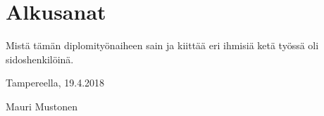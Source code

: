 \chapter*{Alkusanat}
\label{ch:alkusanat}

\begin{it}
	Mistä tämän diplomityönaiheen sain ja kiittää eri ihmisiä ketä työssä oli sidoshenkilöinä.
\end{it}

\vspace{2\baselineskip}

Tampereella, 19.4.2018

\vspace{2\baselineskip}

Mauri Mustonen